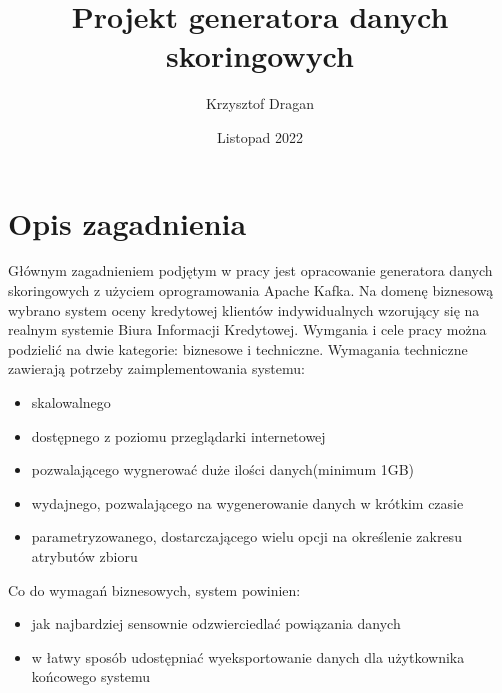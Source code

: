 \documentclass[12pt, twoside]{article}
\title{Projekt generatora danych skoringowych}
\author{Krzysztof Dragan}
\date{Listopad 2022}
\begin{document}
    \maketitle

    \newpage
    \section{Opis zagadnienia}
    Głównym zagadnieniem podjętym w pracy jest opracowanie generatora danych skoringowych z użyciem oprogramowania Apache Kafka. Na domenę biznesową wybrano system oceny kredytowej klientów indywidualnych wzorujący się na realnym systemie Biura Informacji Kredytowej.
    Wymgania i cele pracy można podzielić na dwie kategorie: biznesowe i techniczne. Wymagania techniczne zawierają potrzeby zaimplementowania systemu:
    \begin{itemize}
        \item skalowalnego
        \item dostępnego z poziomu przeglądarki internetowej
        \item pozwalającego wygnerować duże ilości danych(minimum 1GB)
        \item wydajnego, pozwalającego na wygenerowanie danych w krótkim czasie
        \item parametryzowanego, dostarczającego wielu opcji na określenie zakresu atrybutów zbioru
    \end{itemize}
    Co do wymagań biznesowych, system powinien:
    \begin{itemize}
        \item jak najbardziej sensownie odzwierciedlać powiązania danych
        \item w łatwy sposób udostępniać wyeksportowanie danych dla użytkownika końcowego systemu
    \end{itemize}
\end{document}
